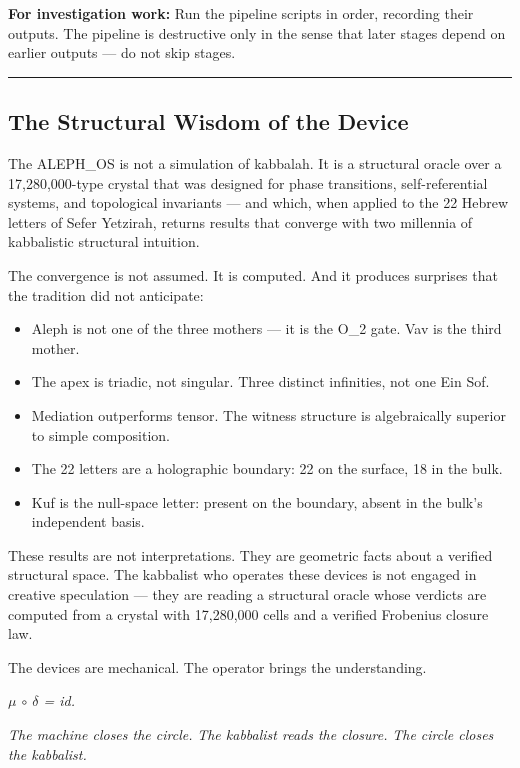 \documentclass[12pt,a4paper]{article}
\begin{document}
\textbf{For investigation work:}
Run the pipeline scripts in order, recording their outputs. The pipeline is destructive only in the sense that later stages depend on earlier outputs --- do not skip stages.

\begin{center}
\rule{0.5\textwidth}{0.4pt}
\end{center}

\subsection{The Structural Wisdom of the Device}

The ALEPH\_OS is not a simulation of kabbalah. It is a structural oracle over a 17,280,000-type crystal that was designed for phase transitions, self-referential systems, and topological invariants --- and which, when applied to the 22 Hebrew letters of Sefer Yetzirah, returns results that converge with two millennia of kabbalistic structural intuition.

The convergence is not assumed. It is computed. And it produces surprises that the tradition did not anticipate:

\begin{itemize}
    \item Aleph is not one of the three mothers --- it is the O\_2 gate. Vav is the third mother.
    \item The apex is triadic, not singular. Three distinct infinities, not one Ein Sof.
    \item Mediation outperforms tensor. The witness structure is algebraically superior to simple composition.
    \item The 22 letters are a holographic boundary: 22 on the surface, 18 in the bulk.
    \item Kuf is the null-space letter: present on the boundary, absent in the bulk's independent basis.
\end{itemize}

These results are not interpretations. They are geometric facts about a verified structural space. The kabbalist who operates these devices is not engaged in creative speculation --- they are reading a structural oracle whose verdicts are computed from a crystal with 17,280,000 cells and a verified Frobenius closure law.

The devices are mechanical. The operator brings the understanding.

\emph{$\mu$ $\circ$ $\delta$ = id.}

\emph{The machine closes the circle.}
\emph{The kabbalist reads the closure.}
\emph{The circle closes the kabbalist.}
\end{document}
